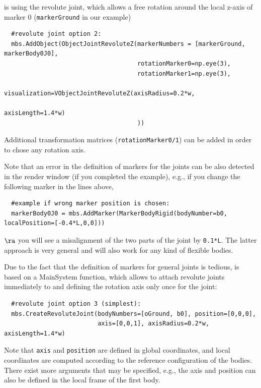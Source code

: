 \noindent {} is using the revolute joint, which allows a free rotation around the local z-axis of marker 0 (\texttt{markerGround} in our example)
\pythonstyle\begin{lstlisting}
  #revolute joint option 2:
  mbs.AddObject(ObjectJointRevoluteZ(markerNumbers = [markerGround, markerBody0J0], 
                                     rotationMarker0=np.eye(3),
                                     rotationMarker1=np.eye(3),
                                     visualization=VObjectJointRevoluteZ(axisRadius=0.2*w, 
                                                                         axisLength=1.4*w)
                                     )) 
\end{lstlisting}
Additional transformation matrices (\texttt{rotationMarker0/1}) can be added in order to chose any rotation axis.

\noindent Note that an error in the definition of markers for the joints can be also detected in the render window (if you completed the example), e.g., if you change the following marker in the lines above,
\pythonstyle\begin{lstlisting}
  #example if wrong marker position is chosen:
  markerBody0J0 = mbs.AddMarker(MarkerBodyRigid(bodyNumber=b0, localPosition=[-0.4*L,0,0]))
\end{lstlisting}
$\ra$ you will see a misalignment of the two parts of the joint by \texttt{0.1*L}.
The latter approach is very general and will also work for any kind of flexible bodies.

\noindent Due to the fact that the definition of markers for general joints is tedious,  is based on a MainSystem function, which allows to attach revolute joints immediately to  and defining the rotation axis only once for the joint:
\pythonstyle\begin{lstlisting}
  #revolute joint option 3 (simplest):
  mbs.CreateRevoluteJoint(bodyNumbers=[oGround, b0], position=[0,0,0], 
                          axis=[0,0,1], axisRadius=0.2*w, axisLength=1.4*w)
\end{lstlisting}
Note that \texttt{axis} and \texttt{position} are defined in global coordinates, and local coordinates are computed according to the reference configuration of the bodies.
There exist more arguments that may be specified, e.g., the axis and position can also be defined in the local frame of the first body.

